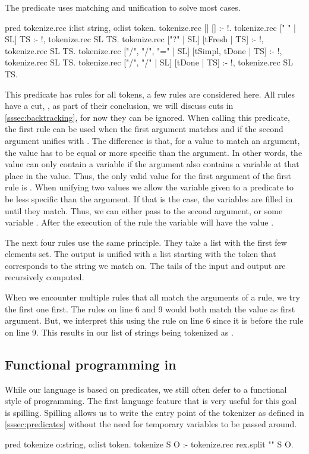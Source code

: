 \documentclass[thesis.tex]{subfiles}
\begin{document}
{{The predicate  uses matching and unification to solve most cases.
\begin{elpicode}
  pred tokenize.rec i:list string, o:list token.
  tokenize.rec [] [] :- !.
  tokenize.rec [" " | SL] TS :- !, tokenize.rec SL TS.
  tokenize.rec ["?" | SL] [tFresh | TS] :- !, 
    tokenize.rec SL TS.
  tokenize.rec ["/", "/", "=" | SL] 
               [tSimpl, tDone | TS] :- !, 
    tokenize.rec SL TS.
  tokenize.rec ["/", "/" | SL] [tDone | TS] :- !, 
    tokenize.rec SL TS.
\end{elpicode}
This predicate has rules for all tokens, a few rules are considered here. All rules have a cut, \elpii{!}, as part of their conclusion, we will discuss cuts in \cref{sssec:backtracking}, for now they can be ignored. When calling this predicate, the first rule can be used when the first argument matches \elpii{[]} and if the second argument unifies with \elpii{[]}. The difference is that, for a value to match an argument, the value has to be equal or more specific than the argument. In other words, the value can only contain a variable if the argument also contains a variable at that place in the value. Thus, the only valid value for the first argument of the first rule is \elpii{[]}. When unifying two values we allow the variable given to a predicate to be less specific than the argument. If that is the case, the variables are filled in until they match. Thus, we can either pass \elpii{[]} to the second argument, or some variable . After the execution of the rule the variable  will have the value \elpii{[]}.

The next four rules use the same principle. They take a list with the first few elements set. The output is unified with a list starting with the token that corresponds to the string we match on. The tails of the input and output are recursively computed.

When we encounter multiple rules that all match the arguments of a rule, we try the first one first. The rules on line 6 and 9 would both match the value \elpii{["/", "/", "="]} as first argument. But, we interpret this using the rule on line 6 since it is before the rule on line 9. This results in our list of strings being tokenized as .

\subsection{Functional programming in \elpi}
While our language is based on predicates, we still often defer to a functional style of programming. The first language feature that is very useful for this goal is spilling. Spilling allows us to write the entry point of the tokenizer as defined in \cref{sssec:predicates} without the need for temporary variables to be passed around.
\begin{elpicode}
  pred tokenize o:string, o:list token.
  tokenize S O :- tokenize.rec {rex.split "" S} O.
\end{elpicode}

}}
\end{document}
